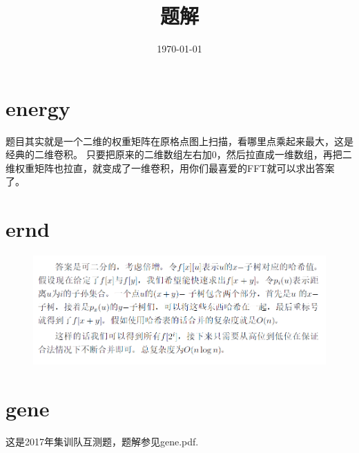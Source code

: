 \documentclass[a4paper,10pt]{article}
\title{题解}
\date{\today}
\begin{document}
	\maketitle
	\section{energy}
      
      题目其实就是一个二维的权重矩阵在原格点图上扫描，看哪里点乘起来最大，这是经典的二维卷积。
      只要把原来的二维数组左右加0，然后拉直成一维数组，再把二维权重矩阵也拉直，就变成了一维卷积，用你们最喜爱的FFT就可以求出答案了。
      
	\section{ernd}
	
	\begin{figure}[h]
		\includegraphics[width=\linewidth]{ernd_sol.png}
	\end{figure}
	
	\section{gene}
		这是2017年集训队互测题，题解参见gene.pdf.
	
\end{document}
